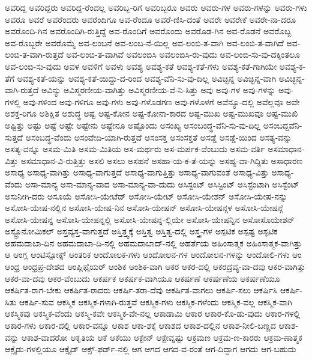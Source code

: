 {ಅವರಿದ್ದ
ಅವರಿದ್ದರು
ಅವರಿದ್ದ-ರೆಂದಲ್ಲ
ಅವರಿಬ್ಬ-ರಿಗೆ
ಅವರಿಬ್ಬರೂ
ಅವರು
ಅವರು-ಗಳ
ಅವರು-ಗಳನ್ನು
ಅವರು-ಗಳು
ಅವರೂ
ಅವರೆ
ಅವರೆಂದರು
ಅವರೆಂದಿಗೂ
ಅವ-ರೆಂದೂ
ಅವರೆ-ಣಿಸಿ-ದಂತೆ
ಅವರೇ
ಅವರೇಕೆ
ಅವರೇ-ನಾ-ದರೂ
ಅವರೊಂದಿ-ಗಿನ
ಅವರೊಂದಿಗಿ-ರುತ್ತಿದ್ದೆ
ಅವ-ರೊಂದಿಗೆ
ಅವರೊಂದು
ಅವರೊಡ-ಗಿನ
ಅವ-ರೊಡನೆ
ಅವರೊಬ್ಬ
ಅವ-ರೊಬ್ಬರೇ
ಅವರೊಮ್ಮೆ
ಅವ-ಲಂಬನೆ
ಅವ-ಲಂಬ-ನೆ-ಯಿಲ್ಲ
ಅವ-ಲಂಬಿ-ತ-ವಾಗಿ
ಅವ-ಲಂಬಿ-ತ-ವಾಗಿದೆ
ಅವ-ಲಂಬಿ-ತ-ವಾಗಿ-ರುತ್ತದೆ
ಅವ-ಲಂಬಿ-ತ-ವಾಗಿವೆ
ಅವಲಂಬಿಸಿ
ಅವಲಂಬಿಸಿ-ರು-ವುದು
ಅವ-ಲಂಬಿ-ಸು-ವು-ದಕ್ಕಿಂತಲೂ
ಅವ-ಲಂಬಿ-ಸು-ವುದು
ಅವಳ
ಅವಳಿಗೆ
ಅವಳು
ಅವಶ್ಯ
ಅವಶ್ಯ-ಕತೆ
ಅವಶ್ಯ-ಕತೆ-ಗಳು
ಅವಶ್ಯ-ಕತೆ-ಗಾಗಿಯೇ
ಅವಶ್ಯ-ಕ-ತೆಗೆ
ಅವಶ್ಯ-ಕತೆ-ಯನ್ನು
ಅವಶ್ಯ-ಕತೆ-ಯಿದ್ದು-ದ-ರಿಂದ
ಅವಶ್ಯ-ವೆನಿ-ಸು-ವು-ದಿಲ್ಲ
ಅವಿಚ್ಛಿನ್ನ
ಅವಿಚ್ಛಿನ್ನ-ವಾಗಿ
ಅವಿಚ್ಛಿನ್ನ-ವಾಗಿ-ರುತ್ತದೆ
ಅವಿನ್ಯು
ಅವಿಸ್ಮರಣೀಯ-ವಾಗಿತ್ತು
ಅವಿಸ್ಮರಣೀಯ-ವೆ-ನಿ-ಸಿತ್ತು
ಅವು
ಅವು-ಗಳ
ಅವು-ಗಳನ್ನು
ಅವು-ಗಳಲ್ಲಿ
ಅವು-ಗಳಿಂದ
ಅವು-ಗಳಿಗೂ
ಅವು-ಗಳು
ಅವು-ಗಳೊಡಗಣ
ಅವು-ಗಳೊಳಗೆ
ಅವೆನ್ಯೂ-ದಲ್ಲಿ
ಅವೆಲ್ಲವೂ
ಅವೇ
ಅಶಕ್ತ-ರಿಗೂ
ಅಶಿಕ್ಷಿತ
ಅಶುದ್ಧ
ಅಷ್ಟ
ಅಷ್ಟ-ಕೋನ
ಅಷ್ಟ-ಕೋನಾ-ಕಾರದ
ಅಷ್ಟ-ಮುಖ
ಅಷ್ಟ-ಮುಖವೂ
ಅಷ್ಟ-ಮುಖಿ
ಅಷ್ಟಿತ್ತು
ಅಷ್ಟು
ಅಷ್ಟೆ
ಅಷ್ಟೇ
ಅಷ್ಟೇನು
ಅಷ್ಟೇನೂ
ಅಷ್ಟೊಂದು
ಅಸಂಖ್ಯ
ಅಸಂಬಂದ್ಧ-ವೆನಿ-ಸು-ವು-ದಿಲ್ಲ
ಅಸಂಬದ್ದವೆನಿ-ಸುತ್ತದೆ
ಅಸಂಬದ್ಧ-ವೆಂದು
ಅಸಂವೇದಿ-ಯಾಗಿ-ರುತ್ತದೆ
ಅಸಂಸಕ್ತ
ಅಸಂಸಕ್ತತೆ
ಅಸಡ್ಡೆ
ಅಸಡ್ಡೆ-ಯಿಂದ
ಅಸತ್ಯ-ವನ್ನು
ಅಸತ್ಯ-ವನ್ನೂ
ಅಸಮ-ಮಿತಿ
ಅಸಮ-ಮಿತಿಯ
ಅಸ-ಮರ್ಥರು
ಅಸ-ಮರ್ಪಕ-ವೆಂಬುದು
ಅಸಮ-ವರ್ತಿ
ಅಸಮಾಧಾನ-ವಿತ್ತು
ಅಸಮಾಧಾನ-ವಿ-ರುತ್ತಿತ್ತು
ಅಸಲಿ
ಅಸಲು
ಅಸಹನೆ
ಅಸಹಾ-ಯ-ಕ-ತೆ-ಯನ್ನು
ಅಸಹ್ಯ-ವಾ-ಗಿದ್ದಿತು
ಅಸಾಧಾರಣ
ಅಸಾಧ್ಯ
ಅಸಾಧ್ಯ-ವಾಗಿತ್ತು
ಅಸಾಧ್ಯ-ವಾಗುತ್ತದೆ
ಅಸಾಧ್ಯ-ವಾಗುತ್ತಿತ್ತು
ಅಸಾಧ್ಯ-ವಾಗುವಂತೆ
ಅಸಾಧ್ಯ-ವಿತ್ತು
ಅಸಾಧ್ಯ-ವೆಂದು
ಅಸಾ-ಮಾನ್ಯ
ಅಸಾ-ಮಾನ್ಯ-ವಾದ
ಅಸಾ-ಮಾನ್ಯ-ವಾ-ದುದು
ಅಸಿಸ್ಟಂಟ್
ಅಸಿಸ್ಟಿಂಟ್
ಅಸಿಸ್ಟೆಂಟಾಗಿ
ಅಸಿಸ್ಟೆಂಟ್
ಅಸುನೀಗಿ-ದರು
ಅಸೂಯೆ
ಅಸೋಸಿ-ಯೇಟೆಡ್
ಅಸೋಸಿ-ಯೇಟ್
ಅಸೋಸಿ-ಯೇಶನ್
ಅಸೋಸಿ-ಯೇಷ-ನನ್ನು
ಅಸೋಸಿ-ಯೇಷ-ನಲ್ಲಿನ
ಅಸೋಸಿ-ಯೇಷ-ನಿನ
ಅಸೋಸಿ-ಯೇಷನ್
ಅಸೋಸಿ-ಯೇಷನ್ಗಳ
ಅಸೋಸಿ-ಯೇಷನ್ಗೆ
ಅಸೋಸಿ-ಯೇಷನ್ನ
ಅಸೋಸಿ-ಯೇಷನ್ನಲ್ಲಿ
ಅಸೋಸಿ-ಯೇಷನ್ನ-ಲ್ಲಿಯೇ
ಅಸೋಸಿ-ಯೇಷನ್ನಿನ
ಅಸೋಸೊಯೇಶನ್
ಅಸ್ಟ್ರೊನೋಮಿಕಲ್
ಅಸ್ತವ್ಯಸ್ತ-ವಾಗುತ್ತದೆ
ಅಸ್ತಿತ್ತ್ವಕ್ಕೆ
ಅಸ್ತಿತ್ವ
ಅಸ್ತಿತ್ವ-ದಲ್ಲಿ
ಅಸ್ತ್ರ-ಗಳ
ಅಸ್ಪಟಿಕ
ಅಸ್ಪಷ್ಟ
ಅಸ್ಫಟಿಕ
ಅಹಮದಾಬಾ-ದಿನ
ಅಹಮದಾಬಾ-ದಿ-ನಲ್ಲಿ
ಅಹಮದಾಬಾದ್-ನಲ್ಲಿ
ಅಹರ್ತೆಯ
ಅಹಿಂಸಾತ್ಮಕ
ಅಹಿಂಸಾತ್ಮಕ-ವಾಗಿತ್ತು
ಆ
ಆಂಗ್ಲ
ಆಂಟಿಸ್ಪೋಕ್ಸ್
ಆಂತರಿಕ
ಆಂದೋಲಕ-ಗಳು
ಆಂದೋಲನ-ಗಳ
ಆಂದೋಲನ-ಗಳನ್ನು
ಆಂದೋಲಿ-ಗಳು
ಆಂ
ಆಂಧ್ರ
ಆಂಧ್ರಪ್ರ-ದೇಶದ
ಆಂಪ್ಲಿಫೈಯರ್
ಆಂಶಿಕ
ಆಂಶಿಕ-ವಾಗಿ
ಆಕರ
ಆಕರ-ದಲ್ಲಿ
ಆಕರದ್ರವ್ಯ-ವಾ-ದವು
ಆಕರ-ವಾಗಿತ್ತು
ಆಕರ-ವಾ-ದವು
ಆಕರ-ವೆಂಬುದು
ಆಕರ್ಷಕ
ಆಕರ್ಷಕ-ವಾಗಿಯೂ
ಆಕರ್ಷಣೆ
ಆಕರ್ಷಣೆಯ
ಆಕರ್ಷಣೆಯೂ
ಆಕರ್ಷಿತ-ರಾಗ-ಬೇಕು
ಆಕರ್ಷಿತ-ರಾದರು
ಆಕರ್ಷಿ-ತರಾ-ದೆವು
ಆಕರ್ಷಿತ-ವಾಗಲು
ಆಕರ್ಷಿ-ಸಲು
ಆಕರ್ಷಿಸಿ
ಆಕರ್ಷಿ-ಸಿತು
ಆಕರ್ಷಿ-ಸುವ
ಆಕಸ್ಮಿಕ
ಆಕಸ್ಮಿಕ-ಗಳಾಗಿ-ರುತ್ತವೆ
ಆಕಸ್ಮಿಕ-ಗಳು
ಆಕಸ್ಮಿಕ-ಗಳೆಂದು
ಆಕಸ್ಮಿಕ-ವಲ್ಲ
ಆಕಸ್ಮಿಕ-ವಾಗಿ
ಆಕಸ್ಮಿಕವು
ಆಕಸ್ಮಿಕ-ವೆಂದು
ಆಕಸ್ಮಿ-ಕವೇ
ಆಕಸ್ಮಿಕ-ವೇ-ನಲ್ಲ
ಆಕಾಡಾಮಿ
ಆಕಾರ
ಆಕಾರ-ಕೊ-ಡು-ವುದು
ಆಕಾರ-ಗಳಲ್ಲಿ
ಆಕಾರ-ಗಳು
ಆಕಾರ-ದಲ್ಲಿ
ಆಕಾರ-ವನ್ನೂ
ಆಕಾಶ
ಆಕಾ-ಶಕ್ಕೆ
ಆಕಾಶದ
ಆಕಾಶ-ದಲ್ಲಿನ
ಆಕಾಶ-ನೀಲಿ-ಬಣ್ಣದ
ಆಕಾಶ-ವನ್ನು
ಆಕಾಶ-ವಾದರೋ
ಆಕೃತಿಯ
ಆಕೆ
ಆಕೆಯು
ಆಕ್ಟೇನ್
ಆಕ್ಟೇವ್ನಷ್ಟು
ಆಕ್ರಮಣ
ಆಕ್ರಮ-ಣ-ಕಾರರು
ಆಕ್ರಮ-ಣಾತ್ಮಕ
ಆಕ್ಸೈಡು-ಗಳಲ್ಲಿಯೂ
ಆಕ್ಸೈಡ್
ಆಕ್ಸ್-ಫರ್ಡ್-ನಲ್ಲಿ
ಆಗ
ಆಗದ
ಆಗದ-ವ-ರಂತೆ
ಆಗ-ದಿದ್ದಾಗ
ಆಗದು
ಆಗ-ಬಹುದು
}
